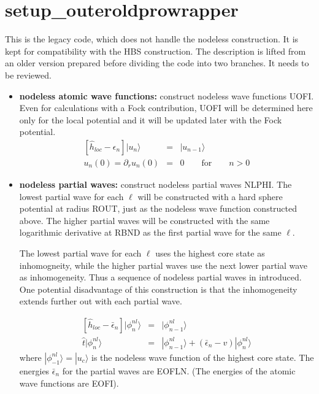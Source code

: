 \documentclass[11pt,a4paper]{report}
\begin{document}
\section{setup\_outeroldprowrapper}
\label{sec:outeroldprowrapper}
This is the legacy code, which does not handle the nodeless
construction. It is kept for compatibility with the HBS construction.
The description is lifted from an older version prepared before
dividing the code into two branches. It needs to be reviewed.

\begin{itemize}
\item \textbf{nodeless atomic wave functions:} construct nodeless wave
  functions UOFI.  Even for calculations with a Fock contribution,
  UOFI will be determined here only for the local potential and it
  will be updated later with the Fock potential.
\begin{eqnarray*}
\left[\hat{h}_{loc}-\epsilon_n\right]|u_n\rangle&=&|u_{n-1}\rangle
\\
u_n(0)=\partial_r u_n(0)&=&0\qquad\text{for}\qquad n>0
\end{eqnarray*}
%
\item \textbf{nodeless partial waves:} construct nodeless partial
  waves NLPHI.  The lowest partial wave for each $\ell$ will be
  constructed with a hard sphere potential at radius ROUT, just as the
  nodeless wave function constructed above.  The higher partial waves
  will be constructed with the same logarithmic derivative at RBND as
  the first partial wave for the same $\ell$.

  The lowest partial wave for each $\ell$ uses the highest core state
  as inhomogneity, while the higher partial waves use the next lower
  partial wave as inhomogeneity. Thus a sequence of nodeless partial
  waves in introduced. One potential disadvantage of this
  construction is that the inhomogeneity extends further out with each
  partial wave.

\begin{eqnarray*}
\left[\hat{h}_{loc}-\bar{\epsilon}_n\right]|\phi^{nl}_{n}\rangle&=&
|\phi^{nl}_{n-1}\rangle
\\
\hat{t}|\phi^{nl}_n\rangle
&=&|\phi^{nl}_{n-1}\rangle+(\bar{\epsilon}_n-v)|\phi^{nl}_n\rangle
\end{eqnarray*}
where $|\phi^{nl}_{-1}\rangle=|u_c\rangle$ is the nodeless wave
function of the highest core state. The energies $\bar{\epsilon}_n$
for the partial waves are EOFLN. (The energies of the atomic wave
functions are EOFI).


\end{itemize}
\end{document}

